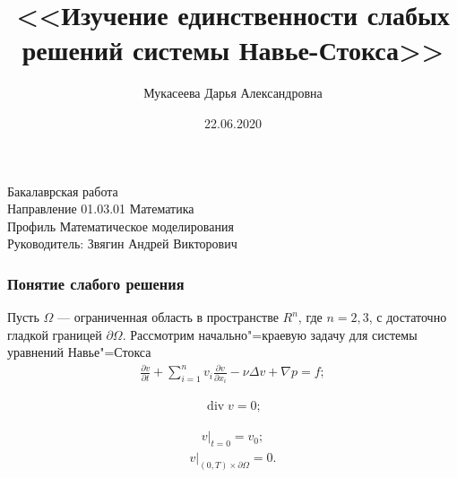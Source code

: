 \documentclass[10pt, pdf, hyperref={unicode}]{beamer}
\title{<<Изучение единственности слабых решений системы Навье-Стокса>>}
\date{22.06.2020}
\author{Мукасеева Дарья Александровна}
\begin{document}
  \begin{frame} %
    \titlepage
    \begin{center}
      Бакалаврская работа\\
      Направление 01.03.01 Математика\\
      Профиль Математическое моделирования\\
      Руководитель: Звягин Андрей Викторович
    \end{center}
  \end{frame}


  \begin{frame}
    \frametitle{Понятие слабого решения}
    \begin{center}
      \begin{minipage}[h]{0.97\linewidth}
        Пусть $\Omega$ --- ограниченная область в пространстве $R^n$, где $n=2, 3$,
        с достаточно гладкой границей $\partial\Omega$.
        Рассмотрим начально"=краевую задачу для системы уравнений Навье"=Стокса
        \begin{equation}\label{eq:5.1}
          \begin{gathered}
            \frac{\partial v}{\partial t}+\sum_{i=1}^nv_i\frac{\partial v}
            {\partial x_i}-\nu\Delta v+\nabla p=f;
          \end{gathered}
        \end{equation}

        \begin{equation}\label{eq:5.2}
          \begin{gathered}
            \operatorname{div} v=0;
          \end{gathered}
        \end{equation}

        \begin{equation}\label{eq:5.3}
          \begin{gathered}
            v|_{t=0}=v_0;
          \end{gathered}
        \end{equation}
        \begin{equation}\label{eq:5.4}
          \begin{gathered}
            v|_{(0, T)\times\partial\Omega}=0.
          \end{gathered}
        \end{equation}
      \end{minipage}
    \end{center}
  \end{frame}
\end{document}
